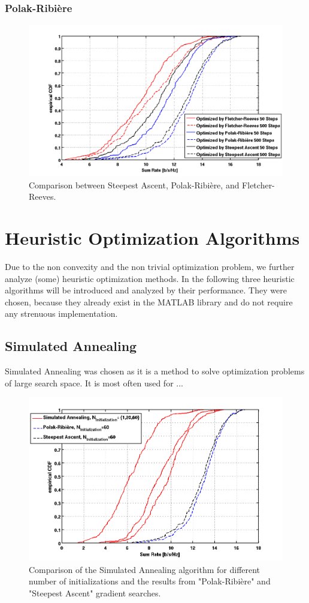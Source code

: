 \subsubsection{Polak-Ribi\`{e}re}
\begin{figure}[h]
\centering
  \includegraphics[width=0.7\linewidth]{images/Conjgradcomparison_edited.png}
\caption{Comparison between Steepest Ascent, Polak-Ribi\`{e}re, and Fletcher-Reeves.}
\label{fig:pr_fr_sa}
\end{figure}

\section{Heuristic Optimization Algorithms}
\label{sec:heuristic}

Due to the non convexity and the non trivial optimization problem, we further analyze (some) heuristic optimization methods.
In the following three heuristic algorithms will be introduced and analyzed by their performance.
They were chosen, because they already exist in the MATLAB library and do not require any strenuous implementation.

\subsection{Simulated Annealing}
\label{sec:sim_annealing}

Simulated Annealing was chosen as it is a method to solve optimization problems of large search space.
\cite{Ingber95}
\cite{matlab:simulann}
It is most often used for ...

\begin{figure}[h]
\centering
  \includegraphics[width=0.7\linewidth]{images/Simannealcomparison.png}
\caption{Comparison of the Simulated Annealing algorithm for different number of initializations and the results from "Polak-Ribi\`{e}re" and "Steepest Ascent" gradient searches.}
\label{fig:pr_fr_sa}
\end{figure}



